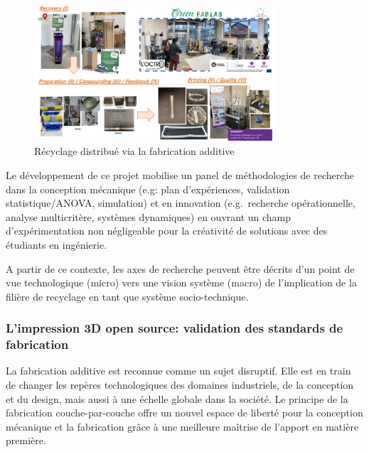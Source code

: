 \documentclass[
  11pt,
]{article}
\begin{document}
\begin{figure}[H]

{\centering \includegraphics[width=0.8\textwidth,height=\textheight]{Figures/INEDIT.jpg}

}

\caption{\label{fig-DRAM-INEDIT}Récyclage distribué via la fabrication
additive}

\end{figure}

Le développement de ce projet mobilise un panel de méthodologies de
recherche dans la conception mécanique (e.g: plan d'expériences,
validation statistique/ANOVA, simulation) et en innovation
(e.g.~recherche opérationnelle, analyse multicritère, systèmes
dynamiques) en ouvrant un champ d'expérimentation non négligeable pour
la créativité de solutions avec des étudiants en ingénierie.

A partir de ce contexte, les axes de recherche peuvent être décrits d'un
point de vue technologique (micro) vers une vision système (macro) de
l'implication de la filière de recyclage en tant que système
socio-technique.

\hypertarget{limpression-3d-open-source-validation-des-standards-de-fabrication}{%
\subsubsection{L'impression 3D open source: validation des standards de
fabrication}\label{limpression-3d-open-source-validation-des-standards-de-fabrication}}

La fabrication additive est reconnue comme un sujet disruptif. Elle est
en train de changer les repères technologiques des domaines industriels,
de la conception et du design, mais aussi à une échelle globale dans la
société. Le principe de la fabrication couche-par-couche offre un nouvel
espace de liberté pour la conception mécanique et la fabrication grâce à
une meilleure maîtrise de l'apport en matière première.
\end{document}
